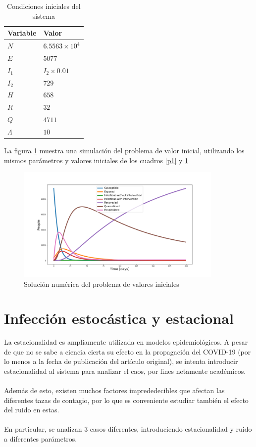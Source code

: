 \documentclass[conference]{IEEEtran}
\begin{document}
\begin{table}[h]
    \centering
    \begin{tabular}{ll}
    \hline
    Variable  & Valor                  \\ \hline
    $N$       & $6.5563 \times 10 ^ 4$ \\ 
    $E$       & $5077$                 \\ 
    $I_1$     & $I_2 \times 0.01$      \\ 
    $I_2$     & $729$                  \\ 
    $H$       & $658$                  \\ 
    $R$       & $32$                   \\ 
    $Q$       & $4711$                 \\ 
    $\Lambda$ & $10$                   \\ \hline
    \end{tabular}
    \caption{Condiciones iniciales del sistema}
    \label{ic1}
\end{table}
La figura \ref{pvi_1} muestra una simulación del problema de valor inicial, utilizando
los mismos parámetros y valores iniciales de los cuadros \ref{p1} y \ref{ic1}

\begin{figure}[h]
    \centering
    \includegraphics[width=10cm]{../Figures/ivp_1.png}
    \caption{Solución numérica del problema de valores iniciales}
    \label{pvi_1}
\end{figure}

\section{Infección estocástica y estacional}

La estacionalidad es ampliamente utilizada en modelos epidemiológicos. A pesar de que no se sabe
a ciencia cierta su efecto en la propagación del COVID-19 (por lo menos a la fecha
de publicación del artículo original), se intenta introducir estacionalidad al sistema para analizar el caos, 
por fines netamente académicos.
\\\\
Además de esto, existen muchos factores imprededecibles que afectan las diferentes tazas de contagio,
por lo que es conveniente estudiar también el efecto del ruido en estas.
\\\\
En particular, se analizan 3 casos diferentes, introduciendo estacionalidad y ruido a diferentes parámetros.
\\\\
\end{document}
